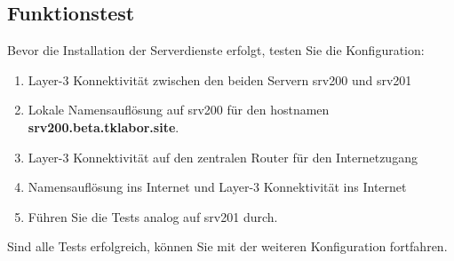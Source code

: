 \subsection{Funktionstest}
Bevor die Installation der Serverdienste erfolgt, testen Sie die Konfiguration:
\begin{enumerate}
  \item Layer-3 Konnektivität zwischen den beiden Servern srv200 und srv201
  \item Lokale Namensauflösung auf srv200 für den hostnamen
  \textbf{srv200.beta.tklabor.site}.
  \item Layer-3 Konnektivität auf den zentralen Router für den Internetzugang
  \item Namensauflösung ins Internet und Layer-3 Konnektivität ins Internet
  \item Führen Sie die Tests analog auf srv201 durch.
\end{enumerate}

Sind alle Tests erfolgreich, können Sie mit der weiteren Konfiguration
fortfahren.
